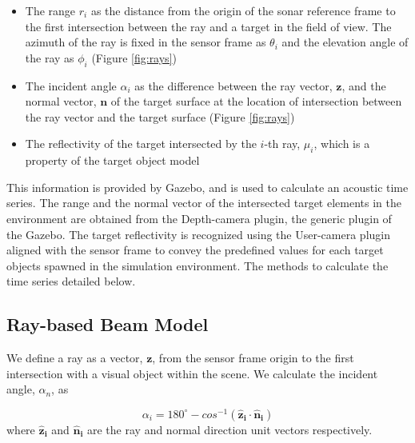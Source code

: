 \documentclass[utf8]{frontiersSCNS} %
\begin{document}
\begin{itemize}
\item  The range $r_i$ as the distance from the origin of the sonar reference frame to the first intersection between the ray and a target in the field of view. The azimuth of the ray is fixed in the sensor frame as $\theta_i$ and the elevation angle of the ray as $\phi_i$ (Figure \ref{fig:rays})

\item  The incident angle $\alpha_i$ as the difference between the ray vector, $\mathbf{z}$, and the normal vector, $\mathbf{n}$ of the target surface at the location of intersection between the ray vector and the target surface (Figure \ref{fig:rays})

\item  The reflectivity of the target intersected by the $i$-th ray, $\mu_i$, which is a property of the target object model

\end{itemize}
This information is provided by Gazebo, and is used to calculate an acoustic time series. The range and the normal vector of the intersected target elements in the environment are obtained from the Depth-camera plugin, the generic plugin of the Gazebo. The target reflectivity is recognized using the User-camera plugin aligned with the sensor frame to convey the predefined values for each target objects spawned in the simulation environment. The methods to calculate the time series detailed below.


\subsection{Ray-based Beam Model}
We define a ray as a vector, $\mathbf{z}$, from the sensor frame origin to the first intersection with a visual object within the scene. We calculate the incident angle, $\alpha_n$, as

\begin{equation}
    \alpha_i = 180^{\circ} - cos^{-1}(\mathbf{\hat{z}_i} \cdot \mathbf{\hat{n}_i})
\end{equation}
where $\mathbf{\hat{z}_i}$ and $\mathbf{\hat{n}_i}$ are the ray and normal direction unit vectors respectively.
\end{document}
